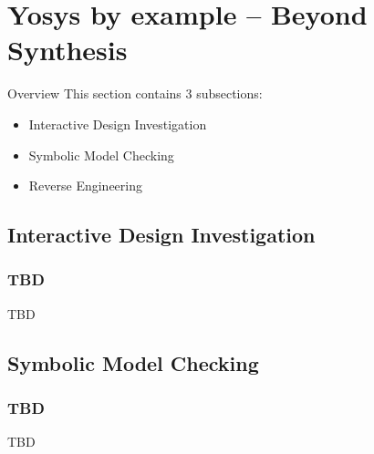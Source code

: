 
\section{Yosys by example -- Beyond Synthesis}

\begin{frame}
\sectionpage
\end{frame}

\begin{frame}{Overview}
This section contains 3 subsections:
\begin{itemize}
\item Interactive Design Investigation
\item Symbolic Model Checking
\item Reverse Engineering
\end{itemize}
\end{frame}


\subsection{Interactive Design Investigation}

\begin{frame}
\subsectionpage
\end{frame}

\subsubsection{TBD}

\begin{frame}{\subsubsecname}
TBD
\end{frame}


\subsection{Symbolic Model Checking}

\begin{frame}
\subsectionpage
\end{frame}

\subsubsection{TBD}

\begin{frame}{\subsubsecname}
TBD
\end{frame}

